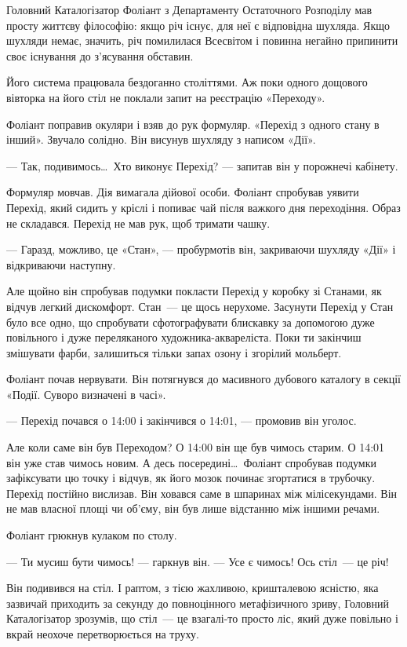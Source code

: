 \documentclass[12pt, a4paper, openany]{book}
\begin{document}
\begin{terrybox}
Головний Каталогізатор Фоліант з Департаменту Остаточного Розподілу мав просту життєву філософію: якщо річ існує, для неї є відповідна шухляда. Якщо шухляди немає, значить, річ помилилася Всесвітом і повинна негайно припинити своє існування до з'ясування обставин.

Його система працювала бездоганно століттями. Аж поки одного дощового вівторка на його стіл не поклали запит на реєстрацію «Переходу».

Фоліант поправив окуляри і взяв до рук формуляр. «Перехід з одного стану в інший». Звучало солідно. Він висунув шухляду з написом «Дії».

--- Так, подивимось\ldots\ Хто виконує Перехід? --- запитав він у порожнечі кабінету.

Формуляр мовчав. Дія вимагала дійової особи. Фоліант спробував уявити Перехід, який сидить у кріслі і попиває чай після важкого дня переходіння. Образ не складався. Перехід не мав рук, щоб тримати чашку.

--- Гаразд, можливо, це «Стан», --- пробурмотів він, закриваючи шухляду «Дії» і відкриваючи наступну.

Але щойно він спробував подумки покласти Перехід у коробку зі Станами, як відчув легкий дискомфорт. Стан~--- це щось нерухоме. Засунути Перехід у Стан було все одно, що спробувати сфотографувати блискавку за допомогою дуже повільного і дуже переляканого художника-аквареліста. Поки ти закінчиш змішувати фарби, залишиться тільки запах озону і згорілий мольберт.

Фоліант почав нервувати. Він потягнувся до масивного дубового каталогу в секції «Події. Суворо визначені в часі».

--- Перехід почався о 14:00 і закінчився о 14:01, --- промовив він уголос.

Але коли саме він був Переходом? О 14:00 він ще був чимось старим. О 14:01 він уже став чимось новим. А десь посередині\ldots\ Фоліант спробував подумки зафіксувати цю точку і відчув, як його мозок починає згортатися в трубочку. Перехід постійно вислизав. Він ховався саме в шпаринах між мілісекундами. Він не мав власної площі чи об'єму, він був лише відстанню між іншими речами.

Фоліант грюкнув кулаком по столу.

--- Ти мусиш бути чимось! --- гаркнув він. --- Усе є чимось! Ось стіл~--- це річ!

Він подивився на стіл. І раптом, з тією жахливою, кришталевою ясністю, яка зазвичай приходить за секунду до повноцінного метафізичного зриву, Головний Каталогізатор зрозумів, що стіл~--- це взагалі-то просто ліс, який дуже повільно і вкрай неохоче перетворюється на труху.


\end{terrybox}
\end{document}
